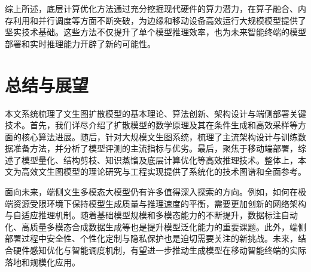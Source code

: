 \documentclass[11pt,a4paper,UTF8]{ctexart}
\begin{document}
综上所述，底层计算优化方法通过充分挖掘现代硬件的算力潜力，在算子融合、内存利用和并行调度等方面不断突破，为边缘和移动设备高效运行大规模模型提供了坚实技术基础。这些方法不仅提升了单个模型推理效率，也为未来智能终端的模型部署和实时推理能力开辟了新的可能性。

\newpage

\section{总结与展望}

本文系统梳理了文生图扩散模型的基本理论、算法创新、架构设计与端侧部署关键技术。首先，我们详尽介绍了扩散模型的数学原理及其在条件生成和高效采样等方面的核心算法进展。随后，针对大规模文生图系统，梳理了主流架构设计与训练数据准备方法，并分析了模型评测的主流指标与优劣。最后，聚焦于移动端部署，综述了模型量化、结构剪枝、知识蒸馏及底层计算优化等高效推理技术。整体上，本文为高效文生图模型的理论研究与工程实现提供了系统化的技术图谱和全面参考。

面向未来，端侧文生多模态大模型仍有许多值得深入探索的方向。例如，如何在极端资源受限环境下保持模型生成质量与推理速度的平衡，需要更加创新的网络架构与自适应推理机制。随着基础模型规模和多模态能力的不断提升，数据标注自动化、高质量多模态合成数据生成等也是提升模型泛化能力的重要课题。此外，端侧部署过程中安全性、个性化定制与隐私保护也是迫切需要关注的新挑战。未来，结合硬件感知优化与智能调度机制，有望进一步推动生成模型在移动智能终端的实际落地和规模化应用。

\newpage


\newpage
\end{document}
